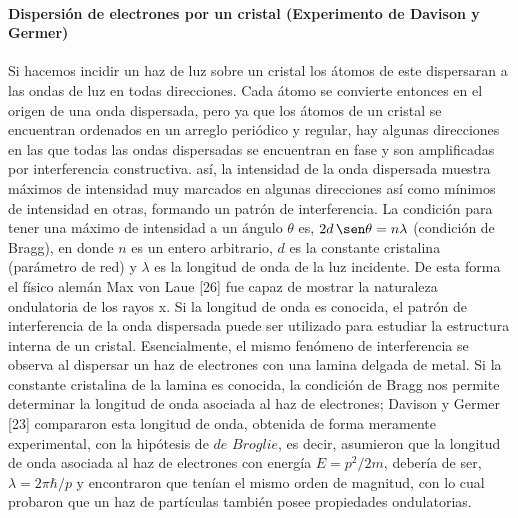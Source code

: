 \documentclass[12pt]{book}
\numberwithin{equation}{chapter}
\begin{document}
\paragraph{Dispersi\'on de electrones por un cristal (Experimento de Davison y Germer)}
Si hacemos incidir un haz de luz sobre un cristal los \'atomos de este dispersaran a las ondas de luz en todas direcciones. Cada \'atomo se convierte entonces en el origen de una onda dispersada, pero ya que los \'atomos de un cristal se encuentran ordenados en un arreglo peri\'odico y regular, hay algunas direcciones en las que todas las ondas dispersadas se encuentran en fase y son amplificadas por interferencia constructiva. as\'i, la intensidad de la onda dispersada muestra m\'aximos de intensidad muy marcados en algunas direcciones as\'i como m\'inimos de intensidad en otras, formando un patr\'on de interferencia. La condici\'on para tener una m\'aximo de intensidad a un \'angulo $\theta$ es, $2d\, \sen \theta = n \lambda$ (condici\'on de Bragg), en donde $n$ es un entero arbitrario, $d$ es la constante cristalina (par\'ametro de red) y $\lambda$ es la longitud de onda de la luz incidente. De esta forma el f\'isico alem\'an Max von Laue [26] fue capaz de mostrar la naturaleza ondulatoria de los rayos x. Si la longitud de onda es conocida, el patr\'on de interferencia de la onda dispersada puede ser utilizado para estudiar la estructura interna de un cristal. Esencialmente, el mismo fen\'omeno de interferencia se observa al dispersar un haz de electrones con una lamina delgada de metal. Si la constante cristalina de la lamina es conocida, la condici\'on de Bragg nos permite determinar la longitud de onda asociada al haz de electrones; Davison y Germer [23] compararon esta longitud de onda, obtenida de forma meramente experimental, con la hip\'otesis de $de$ $Broglie$, es decir, asumieron que la longitud de onda asociada al haz de electrones con energ\'ia $E= p^{2}/2m$, deber\'ia de ser, $\lambda = 2 \pi \hbar / p$ y encontraron que ten\'ian el mismo orden de magnitud, con lo cual probaron que un haz de part\'iculas tambi\'en posee propiedades ondulatorias.
 
\end{document}
